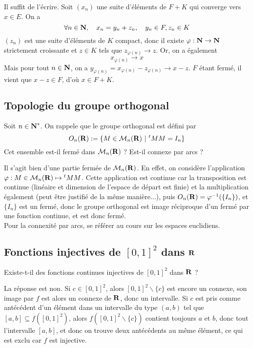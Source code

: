 \begin{correction}
	Il suffit de l'écrire. Soit $(x_n)$ une suite d'éléments de $F+K$ qui converge vers $x\in E$. On a \[\forall n\in\operatorname{\mathbf{N}},\quad x_n=y_n+z_n,\quad y_n\in F,z_n\in K\]
	$(z_n)$ est une suite d'éléments de $K$ compact, donc il existe $\varphi :\operatorname{\mathbf{N}}\to \operatorname{\mathbf{N}}$ strictement croissante et $z\in K$ tels que $z_{\varphi(n)}\longrightarrow z$. Or, on a également \[x_{\varphi(n)}\longrightarrow x\]
	Mais pour tout $n\in\operatorname{\mathbf{N}}$, on a $y_{\varphi(n)}=x_{\varphi(n)}-z_{\varphi(n)}\longrightarrow x-z$. $F$ étant fermé, il vient que $x-z\in F$, d'où $x\in F+K$.
\end{correction}

\subsection{Topologie du groupe orthogonal}
\begin{exercice}
	Soit $n\in\operatorname{\mathbf{N}}^*$. On rappele que le groupe orthogonal est défini par \[O_n(\R):=\lbrace M\in\mathcal M_n(\R)\ |\ {}^tMM=I_n\rbrace\]
	Cet ensemble est-il fermé dans $\mathcal M_n(\operatorname{\mathbf{R}})$ ? Est-il connexe par arcs ?
\end{exercice}

\begin{correction}
	Il s'agit bien d'une partie fermée de $\mathcal M_n(\operatorname{\mathbf{R}})$. En effet, on considère l'application $\varphi : M\in\mathcal M_n(\operatorname{\mathbf{R}})\mapsto {}^tMM$. Cette application est continue car la transposition est continue (linéaire et dimension de l'espace de départ est finie) et la multiplication également (peut être justifié de la même manière...), puis $O_n(\operatorname{\mathbf{R}})=\varphi^{-1}(\lbrace I_n\rbrace)$, et $\lbrace I_n\rbrace$ est un fermé, donc le groupe orthogonal est image réciproque d'un fermé par une fonction continue, et est donc fermé.\\
	Pour la connexité par arcs, se référer au cours sur les espaces euclidiens.
\end{correction}

\subsection{Fonctions injectives de $[0,1]^2$ dans $\operatorname{\mathbf{R}}$}
\begin{exercice}
    Existe-t-il des fonctions continues injectives de $[0,1]^2$ dans $\operatorname{\mathbf{R}}$ ?
\end{exercice}

\begin{correction}
    La réponse est non.
    Si $c\in[0,1]^2$, alors $[0,1]^2\backslash\lbrace c\rbrace$ est encore un connexe,
    son image par $f$ est alors un connexe de $\operatorname{\mathbf{R}}$, donc un intervalle. 
    Si $c$ est pris comme antécédent d'un élément dans un intervalle du type $(a,b)$ tel que $[a,b]\subseteq f([0,1]^2)$,
    alors $f([0,1]^2\backslash\lbrace c\rbrace)$ contient toujours $a$ et $b$, donc tout l'intervalle $[a,b]$, et donc on trouve deux antécédents au même élément,
    ce qui est exclu car $f$ est injective.
\end{correction}

